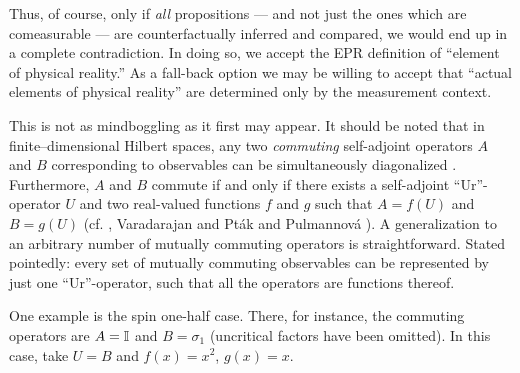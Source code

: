 \documentclass[%
  preprint,
 showpacs,
 showkeys,
 preprintnumbers,
 amsmath,amssymb,
 aps,
 rmp,
  longbibliography,
 ]{revtex4-1}
\begin{document}
Thus, of course, only if {\em all} propositions --- and not just the
ones
which are comeasurable --- are counterfactually inferred and compared,
we
would end up in a complete contradiction. In doing so, we accept the EPR
definition of
``element of physical reality.''
As a fall-back option we may be willing
to accept that ``actual elements of physical reality'' are determined
only by the measurement context.

This is not as mindboggling as it first may appear.
It should be noted that in finite--dimensional Hilbert
spaces, any two {\em commuting} self-adjoint operators
$A$ and $B$ corresponding to observables can be
simultaneously diagonalized
\cite[section 79]{halmos-vs}.
Furthermore, $A$ and $B$ commute if and only if there
exists a self-adjoint ``Ur''-operator $U$ and two real-valued functions
$f$ and
$g$ such that $A=f(U)$ and $B=g(U)$
(cf.
\cite[Section 84]{halmos-vs},
Varadarajan
\cite[p. 119-120, Theorem 6.9]{varadarajanI} and
  Pt{\'{a}}k and Pulmannov{\'{a}}
\cite[p. 89, Theorem 4.1.7]{pulmannova-91}).
 A generalization to an arbitrary
number of
mutually commuting operators is straightforward. Stated pointedly: every
set of mutually commuting observables
can be represented by just one ``Ur''-operator, such that all the
operators are functions thereof.

One example is the spin one-half case. There, for instance, the
commuting operators are $A={\Bbb I}$ and
$B=\sigma_1$ (uncritical factors have been omitted). In this case,
take
$U=B$ and
$f(x)=x^2$,
$g(x)=x$.
\end{document}
